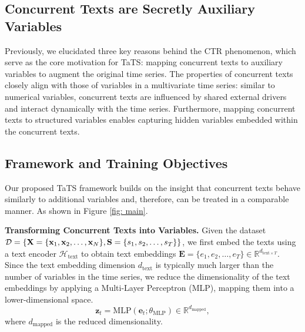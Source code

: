 \subsection{Concurrent Texts are Secretly Auxiliary Variables}  
Previously, we elucidated three key reasons behind the CTR phenomenon, which serve as the core motivation for TaTS: mapping concurrent texts to auxiliary variables to augment the original time series. The properties of concurrent texts closely align with those of variables in a multivariate time series: similar to numerical variables, concurrent texts are influenced by shared external drivers and interact dynamically with the time series. Furthermore, mapping concurrent texts to structured variables enables capturing hidden variables embedded within the concurrent texts.






\subsection{Framework and Training Objectives}
Our proposed TaTS framework builds on the insight that concurrent texts behave similarly to additional variables and, therefore, can be treated in a comparable manner. As shown in Figure \ref{fig: main}.

\textbf{Transforming Concurrent Texts into Variables.}
Given the dataset $\mathcal{D} = \{\mathbf{X} = \{\mathbf{x}_1, \mathbf{x}_2, \dots, \mathbf{x}_N\}, \mathbf{S} = \{s_1, s_2, \dots, s_T\}\}$, we first embed the texts using a text encoder $\mathcal{H}_{\text{text}}$ to obtain text embeddings $\bm{E} = \{e_1, e_2, \dots, e_T\} \in \mathbb{R}^{d_{\text{text} \times T}}$. Since the text embedding dimension $d_{\text{text}}$ is typically much larger than the number of variables in the time series, we reduce the dimensionality of the text embeddings by applying a Multi-Layer Perceptron (MLP), mapping them into a lower-dimensional space.
\begin{equation}
\label{eq: mlp}
\bm{z}_t = \text{MLP}(\bm{e}_t; \theta_{\text{MLP}}) \in \mathbb{R}^{d_{\text{mapped}}},
\end{equation}
where $d_{\text{mapped}}$ is the reduced dimensionality.

